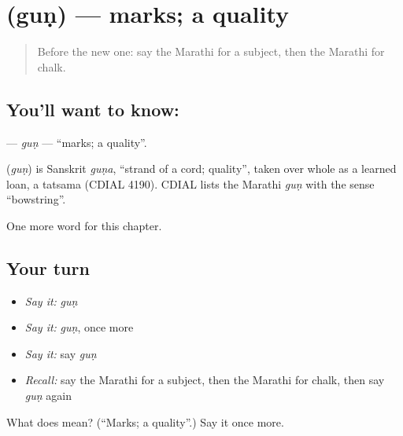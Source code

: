 \section[\texorpdfstring{\mr{गुण} (guṇ)}{गुण (guṇ)}]{ (guṇ) — marks; a quality}

\label{lesson:MR-C221-gun}



\begin{quote}
Before the new one: say the Marathi for a subject, then the Marathi for chalk.
\end{quote}

\subsection*{You'll want to know: }
\textbf{} — \emph{guṇ} — \textquotedblleft{}marks; a quality\textquotedblright{}.

\begin{cousinweb}
\textbf{} (\emph{guṇ}) is Sanskrit \emph{guṇa}, \textquotedblleft{}strand of a cord; quality\textquotedblright{}, taken over whole as a learned loan, a tatsama (CDIAL 4190). CDIAL lists the Marathi \emph{guṇ} with the sense \textquotedblleft{}bowstring\textquotedblright{}.
\end{cousinweb}

\begin{grammarlens}[title={What you've built}]
One more word for this chapter.
\end{grammarlens}

\subsection*{Your turn}
\begin{itemize}
\raggedright
  \item \emph{Say it:} \emph{guṇ}
  \item \emph{Say it:} \emph{guṇ}, once more
  \item \emph{Say it:} say \emph{guṇ}
  \item \emph{Recall:} say the Marathi for a subject, then the Marathi for chalk, then say \emph{guṇ} again
\end{itemize}

\begin{tcolorbox}[breakable,colback=teal!4,colframe=teal!35!black,title={Before you move on}]
What does  mean? (\textquotedblleft{}Marks; a quality\textquotedblright{}.) Say it once more.
\end{tcolorbox}
